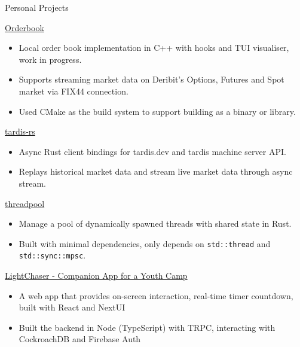 \documentclass{article}
\newlength{\tabin}
\newlength{\secsep}
\newcommand{\lineunder}{\vspace*{-8pt} \\ \hspace*{-6pt} \hrulefill \\ \vspace*{-15pt}}
\newenvironment{tabbedsection}[1]{
  \begin{list}{}{
      \setlength{\itemsep}{0pt}
      \setlength{\labelsep}{0pt}
      \setlength{\labelwidth}{0pt}
      \setlength{\leftmargin}{\tabin}
      \setlength{\rightmargin}{\tabin}
      \setlength{\listparindent}{0pt}
      \setlength{\parsep}{0pt}
      \setlength{\parskip}{0pt}
      \setlength{\partopsep}{0pt}
      \setlength{\topsep}{#1}
    }
  \item[]
}{\end{list}}
\newenvironment{resume_section}[1]{
  \filbreak
  \vspace{2\secsep}
  \textsc{\large#1}
  \lineunder
  \begin{tabbedsection}{\secsep}
}{\end{tabbedsection}}
\newenvironment{resume_subsection}[2][]{
  \textbf{#2} \hfill {\footnotesize #1} \hspace{2em}
  \begin{tabbedsection}{0.5\secsep}
}{\end{tabbedsection}}
\newenvironment{subitems}{
  \renewcommand{\labelitemi}{-}
  \begin{itemize}
      \setlength{\labelsep}{1em}
}{\end{itemize}}
\begin{document}
\begin{resume_section}{Personal Projects}
  \begin{resume_subsection}[(October 2023)]{\href{https://github.com/marcustut/orderbook}{Orderbook}}
    \begin{subitems}
      \item Local order book implementation in C++ with hooks and TUI visualiser, work in progress.
      \item Supports streaming market data on Deribit's Options, Futures and Spot market via FIX44 connection.
      \item Used CMake as the build system to support building as a binary or library.
    \end{subitems}
  \end{resume_subsection}

  \begin{resume_subsection}[(September 2023)]{\href{https://github.com/cybotrade/tardis-rs}{tardis-rs}}
    \begin{subitems}
      \item Async Rust client bindings for tardis.dev and tardis machine server API.
      \item Replays historical market data and stream live market data through async stream.
    \end{subitems}
  \end{resume_subsection}

  \begin{resume_subsection}[(April 2023)]{\href{https://github.com/marcustut/threadpool}{threadpool}}
    \begin{subitems}
      \item Manage a pool of dynamically spawned threads with shared state in Rust.
      \item Built with minimal dependencies, only depends on \texttt{std::thread} and \texttt{std::sync::mpsc}.
    \end{subitems}
  \end{resume_subsection}

  \begin{resume_subsection}[(April 2022)]{\href{https://github.com/marcustut/lightchaser}{LightChaser - Companion App for a Youth Camp}}
    \begin{subitems}
      \item A web app that provides on-screen interaction, real-time timer countdown, built with React and NextUI
      \item Built the backend in Node (TypeScript) with TRPC, interacting with CockroachDB and Firebase Auth
    \end{subitems}
  \end{resume_subsection}


\end{resume_section}
\end{document}
